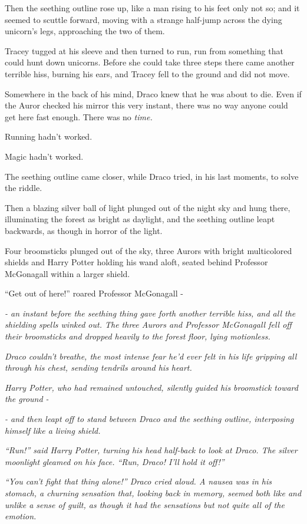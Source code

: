 Then the seething outline rose up, like a man rising to his feet only not so; and it seemed to scuttle forward, moving with a strange half-jump across the dying unicorn's legs, approaching the two of them.

Tracey tugged at his sleeve and then turned to run, run from something that could hunt down unicorns. Before she could take three steps there came another terrible hiss, burning his ears, and Tracey fell to the ground and did not move.

Somewhere in the back of his mind, Draco knew that he was about to die. Even if the Auror checked his mirror this very instant, there was no way anyone could get here fast enough. There was no \emph{time.}

Running hadn't worked.

Magic hadn't worked.

The seething outline came closer, while Draco tried, in his last moments, to solve the riddle.

Then a blazing silver ball of light plunged out of the night sky and hung there, illuminating the forest as bright as daylight, and the seething outline leapt backwards, as though in horror of the light.

Four broomsticks plunged out of the sky, three Aurors with bright multicolored shields and Harry Potter holding his wand aloft, seated behind Professor McGonagall within a larger shield.

``Get out of here!'' roared Professor McGonagall -

\emph{- an instant before the seething thing gave forth another terrible hiss, and all the shielding spells winked out. The three Aurors and Professor McGonagall fell off their broomsticks and dropped heavily to the forest floor, lying motionless.}

\emph{Draco couldn't breathe, the most intense fear he'd ever felt in his life gripping all through his chest, sending tendrils around his heart.}

\emph{Harry Potter, who had remained untouched, silently guided his broomstick toward the ground -}

\emph{- and then leapt off to stand between Draco and the seething outline, interposing himself like a living shield.}

\emph{``Run!'' said Harry Potter, turning his head half-back to look at Draco. The silver moonlight gleamed on his face. ``Run, Draco! I'll hold it off!''}

\emph{``You can't fight that thing alone!'' Draco cried aloud. A nausea was in his stomach, a churning sensation that, looking back in memory, seemed both like and unlike a sense of guilt, as though it had the sensations but not quite all of the emotion.}

